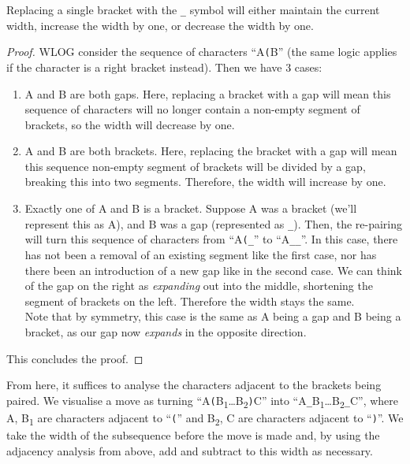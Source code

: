 \begin{observation}
    \label{obs:adjAnalysis}
    Replacing a single bracket with the \texttt{\string_} symbol will either maintain the current width, increase the width by one, or decrease the width by one.
\end{observation}
\begin{proof}
    WLOG consider the sequence of characters ``A\texttt{(}B'' (the same logic applies if the character is a right bracket instead). Then we have 3 cases:
    \begin{enumerate}
        \item A and B are both gaps. Here, replacing a bracket with a gap will mean this sequence of characters will no longer contain a non-empty segment of brackets, so the width will decrease by one.
        \item A and B are both brackets. Here, replacing the bracket with a gap will mean this sequence non-empty segment of brackets will be divided by a gap, breaking this into two segments. Therefore, the width will increase by one.
        \item Exactly one of A and B is a bracket. Suppose A was a bracket (we'll represent this as A), and B was a gap (represented as \texttt{\string_}). Then, the re-pairing will turn this sequence of characters from ``A\texttt{(\string_}'' to ``A\texttt{\string_\string_}''. In this case, there has not been a removal of an existing segment like the first case, nor has there been an introduction of a new gap like in the second case. We can think of the gap on the right as \textit{expanding} out into the middle, shortening the segment of brackets on the left. Therefore the width stays the same. 
        \\ Note that by symmetry, this case is the same as A being a gap and B being a bracket, as our gap now \textit{expands} in the opposite direction.
    \end{enumerate}
    This concludes the proof.
\end{proof}

From here, it suffices to analyse the characters adjacent to the brackets being paired. We visualise a move as turning ``A\texttt{(}B\textsubscript{1}\dots B\textsubscript{2}\texttt{)}C'' into ``A\texttt{\string_}B\textsubscript{1}\dots B\textsubscript{2}\texttt{\string_}C'', where A, B\textsubscript{1} are characters adjacent to ``\texttt{(}'' and B\textsubscript{2}, C are characters adjacent to ``\texttt{)}''. We take the width of the subsequence before the move is made and, by using the adjacency analysis from above, add and subtract to this width as necessary.

